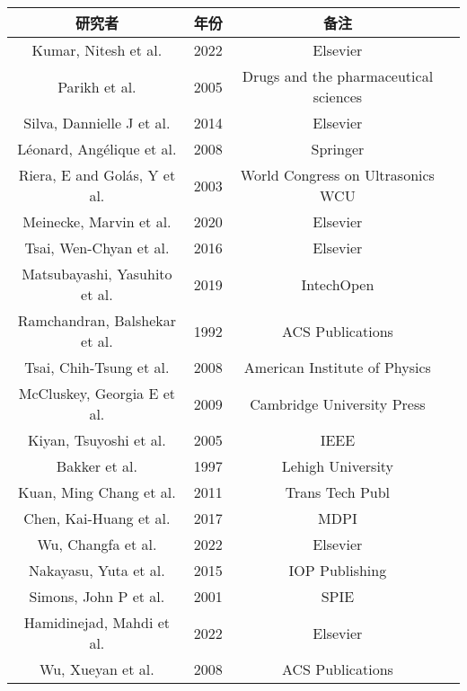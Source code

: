 \begin{center}
\begin{tabular}{cccc}
\hline
研究者 & 年份 & 备注 \\
\hline
Kumar, Nitesh et al. \cite{kumar2022thermalhydraulic} & 2022 & Elsevier \\
Parikh et al. \cite{parikh2005handbook} & 2005 & Drugs and the pharmaceutical sciences \\
Silva, Dannielle J et al. \cite{silva2014modeling} & 2014 & Elsevier \\
L{\'e}onard, Ang{\'e}lique  et al. \cite{leonard2008characterization} & 2008 & Springer \\
Riera, E and Gol{\'a}s, Y et al. \cite{riera2003generation} & 2003 & World Congress on Ultrasonics WCU \\
Meinecke, Marvin et al. \cite{meinecke2020imaging} & 2020 & Elsevier \\
Tsai, Wen-Chyan et al. \cite{tsai2016liposomal} & 2016 & Elsevier \\
Matsubayashi, Yasuhito et al. \cite{matsubayashi2019dusty} & 2019 & IntechOpen \\
Ramchandran, Balshekar et al. \cite{ramchandran1992dynamic} & 1992 & ACS Publications \\
Tsai, Chih-Tsung et al. \cite{tsai2008low} & 2008 & American Institute of Physics \\
McCluskey, Georgia E et al. \cite{mccluskey2009synthesis} & 2009 & Cambridge University Press \\
Kiyan, Tsuyoshi et al. \cite{kiyan2005pulsed} & 2005 & IEEE \\
Bakker et al. \cite{bakker1997surface} & 1997 & Lehigh University \\
Kuan, Ming Chang et al. \cite{kuan2011low} & 2011 & Trans Tech Publ \\
Chen, Kai-Huang et al. \cite{chen2017bipolar} & 2017 & MDPI \\
Wu, Changfa et al. \cite{wu2022recycling} & 2022 & Elsevier \\
Nakayasu, Yuta et al. \cite{nakayasu2015controllable} & 2015 & IOP Publishing \\
Simons, John P et al. \cite{simons2001image} & 2001 & SPIE \\
Hamidinejad, Mahdi et al. \cite{hamidinejad2022electrically} & 2022 & Elsevier \\
Wu, Xueyan et al. \cite{wu2008synthesis} & 2008 & ACS Publications \\
\hline
\end{tabular}
\end{center}